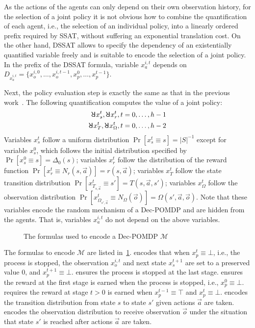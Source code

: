 As the actions of the agents can only depend on their own observation history,
for the selection of a joint policy it is not obvious how to combine the quantification of each agent,
i.e., the selection of an individual policy,
into a linearly ordered prefix required by SSAT,
without suffering an exponential translation cost.
On the other hand, DSSAT allows to specify the dependency of an existentially quantified variable freely and is suitable to encode the selection of a joint policy.
In the prefix of the DSSAT formula,
variable $x_a^{i,t}$ depends on $D_{x_a^{i,t}}=\{x_o^{i,0},\ldots,x_o^{i,t-1},x_p^0,\ldots,x_p^{t-1}\}$.

Next, the policy evaluation step is exactly the same as that in the previous work~\cite{Salmon2020}.
The following quantification computes the value of a joint policy:
\begin{align*}
    \random{} x_s^t, \random{} x_r^t, t=0,\ldots,h-1 \\
    \random{} x_T^t, \random{} x_\Omega^t, t=0,\ldots,h-2
\end{align*}
Variables $x_s^t$ follow a uniform distribution $\Pr[x_s^t \equiv s]=|S|^{-1}$ except for variable $x_s^0$,
which follows the initial distribution specified by $\Pr[x_s^0 \equiv s]=\Delta_0(s)$;
variables $x_r^t$ follow the distribution of the reward function $\Pr[x_r^t \equiv N_r(s,\vec{a})]=r(s,\vec{a})$;
variables $x_T^t$ follow the state transition distribution $\Pr[x_{T_{s,\vec{a}}}^t \equiv s']=T(s,\vec{a},s')$;
variables $x_\Omega^t$ follow the observation distribution $\Pr[x_{\Omega_{s',\vec{a}}}^t \equiv N_\Omega(\vec{o})]=\Omega(s',\vec{a},\vec{o})$.
Note that these variables encode the random mechanism of a Dec-POMDP and are hidden from the agents.
That is, variables $x_a^{i,t}$ do not depend on the above variables.

\begin{figure}[t]
    \centering
    
    \caption{The formulas used to encode a Dec-POMDP $\mathcal{M}$}
    \label{fig:dssat-dec-pomdp-formula}
\end{figure}

The formulas to encode $\mathcal{M}$ are listed in~\cref{fig:dssat-dec-pomdp-formula}.
 encodes that when $x_p^t \equiv \bot$, i.e., the process is stopped, the observation $x_o^{i,t}$ and next state $x_s^{t+1}$ are set to a preserved value $0$, and $x_p^{t+1} \equiv \bot$.
 ensures the process is stopped at the last stage.
 ensures the reward at the first stage is earned when the process is stopped, i.e., $x_p^0 \equiv \bot$.
 requires the reward at stage $t>0$ is earned when $x_p^{t-1} \equiv \top$ and $x_p^t \equiv \bot$.
 encodes the transition distribution from state $s$ to state $s'$ given actions $\vec{a}$ are taken.
 encodes the observation distribution to receive observation $\vec{o}$ under the situation that state $s'$ is reached after actions $\vec{a}$ are taken.

